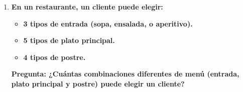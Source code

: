 \documentclass[12pt]{article}
\begin{document}
\begin{enumerate}[label=\textbf{\arabic*.}]
        \item \textbf{En un restaurante, un cliente puede elegir:}
            \begin{itemize}
                \item \textbf{3 tipos de entrada (sopa, ensalada, o aperitivo).}
                \item \textbf{5 tipos de plato principal.}
                \item \textbf{4 tipos de postre.}
            \end{itemize}
            \textbf{Pregunta: ¿Cuántas combinaciones diferentes de menú (entrada, plato principal
            y postre) puede elegir un cliente?}

    \end{enumerate}
\end{document}
